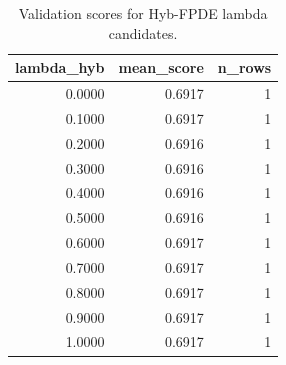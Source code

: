 \begin{table}[t]
\caption{Validation scores for Hyb-FPDE lambda candidates.}
\label{tab:lambda_distribution_computed}
\centering
\begin{tabular}{rrr}
\toprule
lambda\_hyb & mean\_score & n\_rows \\
\midrule
0.0000 & 0.6917 & 1 \\
0.1000 & 0.6917 & 1 \\
0.2000 & 0.6916 & 1 \\
0.3000 & 0.6916 & 1 \\
0.4000 & 0.6916 & 1 \\
0.5000 & 0.6916 & 1 \\
0.6000 & 0.6917 & 1 \\
0.7000 & 0.6917 & 1 \\
0.8000 & 0.6917 & 1 \\
0.9000 & 0.6917 & 1 \\
1.0000 & 0.6917 & 1 \\
\bottomrule
\end{tabular}

\end{table}
